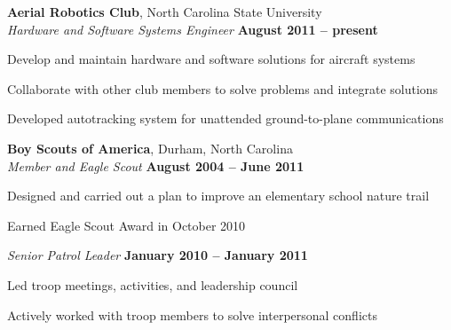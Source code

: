 \documentclass[margin,line,letterpaper]{resume}
\begin{document}
\begin{resume}
    \textbf{Aerial Robotics Club}, North Carolina State University \vspace{2mm}\\\vspace{1mm}%
    \textsl{Hardware and Software Systems Engineer} \hfill \textbf{August 2011 -- present}\vspace{-3mm}\\\vspace{-1mm}%
    \begin{list2}
    \item Develop and maintain hardware and software solutions for aircraft systems
    \item Collaborate with other club members to solve problems and integrate solutions
    \item Developed autotracking system for unattended ground-to-plane communications
    \end{list2}\vspace{-1.5mm}

    \textbf{Boy Scouts of America}, Durham, North Carolina \vspace{2mm}\\\vspace{1mm}%
    \textsl{Member and Eagle Scout} \hfill \textbf{August 2004 -- June 2011}\vspace{-3mm}\\\vspace{-1mm}%
    \begin{list2}
    \item Designed and carried out a plan to improve an elementary school nature trail
    \item Earned Eagle Scout Award in October 2010
    \end{list2}\vspace{-1.5mm}

    \textsl{Senior Patrol Leader} \hfill \textbf{January 2010 -- January 2011}\vspace{-3mm}\\\vspace{-1mm}%
    \begin{list2}
    \item Led troop meetings, activities, and leadership council
    \item Actively worked with troop members to solve interpersonal conflicts
    \end{list2}\vspace{-1.5mm}



\end{resume}
\end{document}
